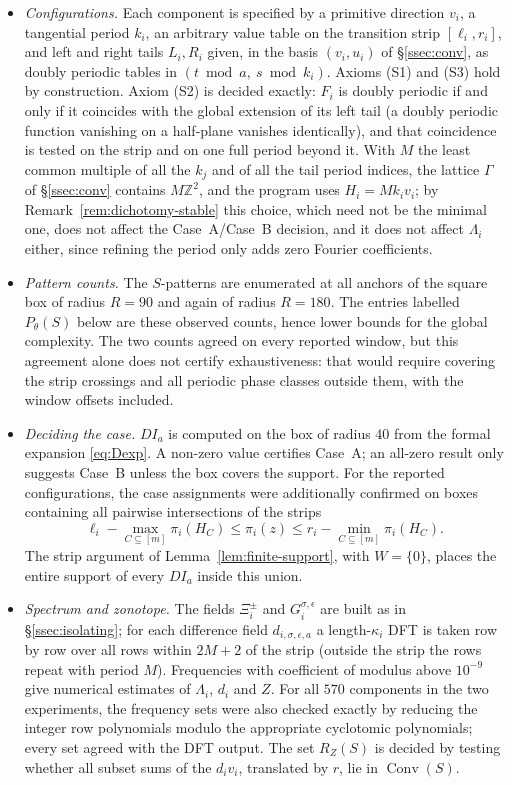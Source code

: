 \documentclass[11pt,reqno]{amsart}
\theoremstyle{plain}
\theoremstyle{definition}
\theoremstyle{remark}
\theoremstyle{plain}
\theoremstyle{remark}
\theoremstyle{definition}
\numberwithin{equation}{section}
\DeclareMathOperator{\Conv}{Conv}
\newcommand{\Z}{\mathbb{Z}}
\begin{document}
\begin{itemize}
\item \emph{Configurations.}  Each component is specified by a primitive
direction $v_i$, a tangential period $k_i$, an arbitrary value table on the
transition strip $[\ell_i,r_i]$, and left and right tails $L_i,R_i$ given, in
the basis $(v_i,u_i)$ of \S\ref{ssec:conv}, as doubly periodic tables in
$(t\bmod a,\ s\bmod k_i)$.  Axioms \textup{(S1)} and \textup{(S3)} hold by
construction.  Axiom \textup{(S2)} is decided exactly: $F_i$ is doubly
periodic if and only if it coincides with the global extension of its left
tail (a doubly periodic function vanishing on a half-plane vanishes
identically), and that coincidence is tested on the strip and on one full
period beyond it.  With $M$ the least common multiple of all the $k_j$ and of
all the tail period indices, the lattice $\Gamma$ of \S\ref{ssec:conv}
contains $M\Z^2$, and the program uses $H_i=Mk_iv_i$; by
Remark~\ref{rem:dichotomy-stable} this choice, which need not be the minimal
one, does not affect the Case~A/Case~B decision, and it does not affect
$\Lambda_i$ either, since refining the period only adds zero Fourier
coefficients.

\item \emph{Pattern counts.}  The $S$-patterns are enumerated at all anchors
of the square box of radius $R=90$ and again of radius $R=180$.
The entries labelled $P_\theta(S)$ below are these observed counts, hence lower
bounds for the global complexity.  The two counts agreed on every reported
window, but this agreement alone does not certify exhaustiveness: that would
require covering the strip crossings and all periodic phase classes outside
them, with the window offsets included.

\item \emph{Deciding the case.}  $DI_a$ is computed on the box of radius $40$
from the formal expansion \eqref{eq:Dexp}.  A non-zero value certifies Case~A;
an all-zero result only suggests Case~B unless the box covers the support.
For the reported configurations, the case assignments were additionally
confirmed on boxes containing all pairwise intersections of the strips
\[\ell_i-\max_{C\subseteq[m]}\pi_i(H_C)\le\pi_i(z)
  \le r_i-\min_{C\subseteq[m]}\pi_i(H_C).\]
The strip argument of Lemma~\ref{lem:finite-support}, with $W=\{0\}$, places
the entire support of every $DI_a$ inside this union.

\item \emph{Spectrum and zonotope.}  The fields $\Xi_i^\pm$ and
$G_i^{\sigma,\epsilon}$ are built as in \S\ref{ssec:isolating}; for each
difference field $d_{i,\sigma,\epsilon,a}$ a length-$\kappa_i$ DFT is taken
row by row over all rows within $2M+2$ of the strip (outside the strip the
rows repeat with period $M$).  Frequencies with coefficient of modulus above
$10^{-9}$ give numerical estimates of $\Lambda_i$, $d_i$ and $Z$.  For all
$570$ components in the two experiments, the frequency sets were also checked
exactly by reducing the integer row polynomials modulo the appropriate
cyclotomic polynomials; every set agreed with the DFT output.  The set
$R_Z(S)$ is decided by testing whether all subset sums of the $d_iv_i$,
translated by $r$, lie in $\Conv(S)$.


\end{itemize}
\end{document}
